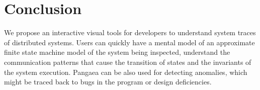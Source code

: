 \section{Conclusion}
\label{sec:conclusion}


We propose an interactive visual tools for developers to understand system traces of
distributed systems.
Users can quickly have a mental model of an approximate finite state machine model of 
the system being inspected, understand the communication patterns that cause the
transition of states and the invariants of the system execution.  Pangaea can be
also used for detecting anomalies, which might be traced back to bugs in the program
or design deficiencies.
